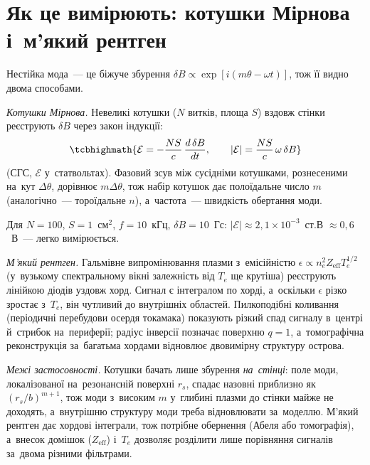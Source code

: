 \section{Як це вимірюють: котушки Мірнова і~м'який рентген}\label{sec:instability-diagnostics}

Нестійка мода~--- це біжуче збурення $\delta B\propto\exp[i(m\theta-\omega t)]$, тож її видно двома способами.

\emph{Котушки Мірнова.} Невеликі котушки ($N$ витків, площа $S$) вздовж стінки реєструють $\delta B$ через закон індукції:
\begin{equation}\label{eq:mirnov}
	\tcbhighmath{\mathcal E=-\frac{NS}{c}\,\frac{d\,\delta B}{dt},\qquad |\mathcal E|=\frac{NS}{c}\,\omega\,\delta B}
\end{equation}
(СГС, $\mathcal E$ у~статвольтах). Фазовий зсув між сусідніми котушками, рознесеними на~кут $\Delta\theta$, дорівнює $m\Delta\theta$,
тож набір котушок дає полоїдальне число $m$ (аналогічно~--- тороїдальне $n$), а~частота~--- швидкість обертання моди.
\begin{Estimate}
Для $N=100$, $S=1$~см$^2$, $f=10$~кГц, $\delta B=10$~Гс: $|\mathcal E|\approx2{,}1\times10^{-3}$~ст.В $\approx0{,}6$~В~--- легко вимірюється.
\end{Estimate}

\emph{М'який рентген.} Гальмівне випромінювання плазми з~емісійністю $\epsilon\propto n_e^2Z_\mathrm{eff}T_e^{1/2}$
(у~вузькому спектральному вікні залежність від $T_e$ ще крутіша) реєструють лінійкою діодів уздовж хорд. Сигнал є інтегралом по хорді,
а~оскільки $\epsilon$ різко зростає з~$T_e$, він чутливий до внутрішніх областей. Пилкоподібні коливання (періодичні перебудови осердя токамака) показують різкий спад сигналу в~центрі й~стрибок на~периферії;
радіус інверсії позначає поверхню $q=1$, а~томографічна реконструкція за~багатьма хордами відновлює двовимірну структуру острова.

\emph{Межі застосовності.} Котушки бачать лише збурення \emph{на~стінці}: поле моди, локалізованої на~резонансній поверхні $r_s$, спадає назовні приблизно як $(r_s/b)^{m+1}$, тож моди з~високим $m$ у~глибині плазми до стінки майже не доходять, а~внутрішню структуру моди треба відновлювати за~моделлю.
М'який рентген дає хордові інтеграли, тож потрібне обернення (Абеля або томографія), а~внесок домішок ($Z_\mathrm{eff}$) і~$T_e$ дозволяє розділити лише порівняння сигналів за~двома різними фільтрами.

